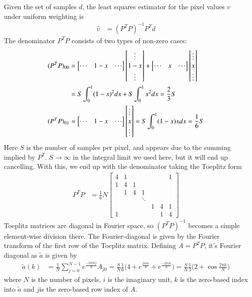 \documentclass{aa}
\begin{document}
Given the set of samples $d$, the least squares estimator for the
pixel values $v$ under uniform weighting is
\begin{align}
	\hat v &= (P^TP)^{-1}P^T d
\end{align}
The denominator $P^TP$ consists of two types of non-zero cases:
\begin{align}
	(P^TP)_{00} &=
		\begin{bmatrix}\cdots & 1-x & \cdots\end{bmatrix}
		\begin{bmatrix}\vdots\\1-x\\\vdots\end{bmatrix} +
		\begin{bmatrix}\cdots & x & \cdots\end{bmatrix}
		\begin{bmatrix}\vdots\\x\\\vdots\end{bmatrix} \notag \\
			&= S \int_0^1 (1-x)^2 dx + S \int_0^1 x^2 dx = \frac{2}{3}S \\
	(P^TP)_{01} &=
		\begin{bmatrix}\cdots & 1-x & \cdots\end{bmatrix}
		\begin{bmatrix}\vdots\\x\\\vdots\end{bmatrix}
			= S \int_0^1 (1-x)x dx = \frac{1}{6}S
\end{align}
Here $S$ is the number of samples per pixel, and appears due to the summing implied by $P^T$.
$S\rightarrow\infty$ in the integral limit we used here,
but it will end up cancelling. With this, we end up with the denominator taking the Toeplitz form
\begin{align}
	P^TP &= \frac{1}{6}N\begin{bmatrix}
		4 & 1 &   &   &  &  & 1 \\
		1 & 4 & 1 &   &  &  & \\
			& 1 & 4 & 1 &  &  & \\
			&   &   & \ddots & & & \\
		  &   &   &   & 1 & 4 & 1 \\
		1 &   &   &   &   & 1 & 4
	\end{bmatrix}
\end{align}
Toeplitz matrices are diagonal in Fourier space, so $(P^TP)^{-1}$ becomes a simple element-wise division
there. The Fourier-diagonal is given by the Fourier transform of the first row of the Toeplitz matrix.
Defining $A = P^TP$, it's Fourier diagonal as $\tilde a$ is given by
\begin{align}
	\tilde a(k) &= \frac{1}{N} \sum_{j=0}^{N-1} e^{\frac{-2\pi ikj}{N}} A_{j0}
	= \frac{S}{N} \frac{1}{6} \Big(4 + e^{\frac{2\pi ik}{N}} + e^{\frac{-2\pi ik}{N}} \Big)
	= \frac{S}{N} \frac{1}{3} \Big(2 + \cos\frac{2\pi k}{N}\Big)
\end{align}
where $N$ is the number of pixels, $i$ is the imaginary unit, $k$ is the zero-based index into $\tilde a$
and $j$is the zero-based row index of $A$.
\end{document}
